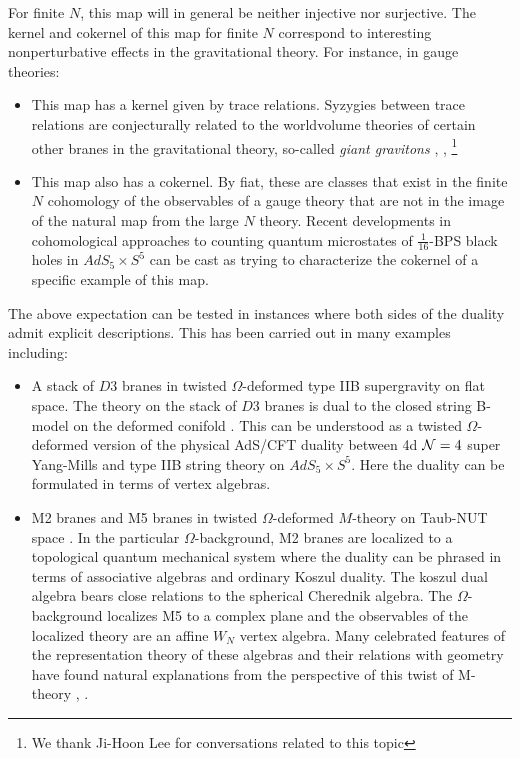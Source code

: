 \begin{rmk}
For finite $N$, this map will in general be neither injective nor surjective. The kernel and cokernel of this map for finite $N$ correspond to interesting nonperturbative effects in the gravitational theory. For instance, in gauge theories:

\begin{itemize}
\item This map has a kernel given by trace relations. Syzygies between trace relations are conjecturally related to the worldvolume theories of certain other branes in the gravitational theory, so-called \textit{giant gravitons} \cite{Gaiotto:2021xce}, \cite{choi2023quantum}, \cite{Imamura} \footnote{We thank Ji-Hoon Lee for conversations related to this topic}

\item This map also has a cokernel. By fiat, these are classes that exist in the finite $N$ cohomology of the observables of a gauge theory that are not in the image of the natural map from the large $N$ theory. Recent developments in cohomological approaches to counting quantum microstates of $\frac{1}{16}$-BPS black holes in $AdS_5\times S^5$ \cite{choi2023quantum} \cite{Chang_2023} \cite{Chang_2013} can be cast as trying to characterize the cokernel of a specific example of this map. 
\end{itemize}
\end{rmk}

\parsec[]
The above expectation can be tested in instances where both sides of the duality admit explicit descriptions. This has been carried out in many examples including:
\begin{itemize}
  \item A stack of $D3$ branes in twisted $\Omega$-deformed type IIB supergravity on flat space. The theory on the stack of $D3$ branes is dual to the closed string B-model on the deformed conifold \cite{costello2021twisted}. This can be understood as a twisted $\Omega$-deformed version of the physical AdS/CFT duality between 4d $\mathcal{N}=4$ super Yang-Mills and type IIB string theory on $AdS_{5}\times S^{5}$. Here the duality can be formulated in terms of vertex algebras. 
  
  \item M2 branes and M5 branes in twisted $\Omega$-deformed $M$-theory on Taub-NUT space \cite{CostelloM5,CostelloM2}. In the particular $\Omega$-background, M2 branes are localized to a topological quantum mechanical system where the duality can be phrased in terms of associative algebras and ordinary Koszul duality. The koszul dual algebra bears close relations to the spherical Cherednik algebra. The $\Omega$-background localizes M5 to a complex plane and the observables of the localized theory are an affine $W_{N}$ vertex algebra. Many celebrated features of the representation theory of these algebras and their relations with geometry have found natural explanations from the perspective of this twist of M-theory \cite{gaiotto2020miura}, \cite{Oh:2021wes}.
\end{itemize}

